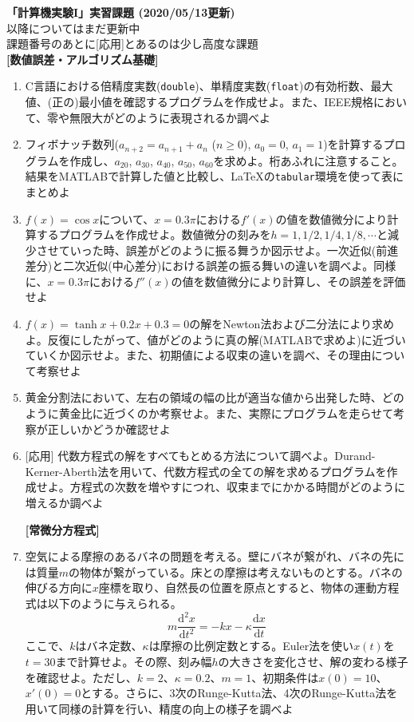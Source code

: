 \documentclass[11pt]{jarticle}
\begin{document}
\noindent
{\bf\large 「計算機実験I」実習課題 (2020/05/13更新)}
\\[-0.5em]

\noindent
[連立一次方程式]以降についてはまだ更新中\\[-0.5em]

\noindent
課題番号のあとに[応用]とあるのは少し高度な課題\\[-0.5em]

{\bf [数値誤差・アルゴリズム基礎]}
\begin{enumerate}
\item C言語における倍精度実数({\tt double})、単精度実数({\tt float})の有効桁数、最大値、(正の)最小値を確認するプログラムを作成せよ。また、IEEE規格において、零や無限大がどのように表現されるか調べよ
  
\item フィボナッチ数列($a_{n+2}=a_{n+1}+a_n$ ($n \ge 0$), $a_0=0$, $a_1=1$)を計算するプログラムを作成し、$a_{20}$, $a_{30}$, $a_{40}$, $a_{50}$, $a_{60}$を求めよ。桁あふれに注意すること。結果をMATLABで計算した値と比較し、\LaTeX の{\tt tabular}環境を使って表にまとめよ
  
\item $f(x)=\cos x$について、$x=0.3\pi$における$f'(x)$の値を数値微分により計算するプログラムを作成せよ。数値微分の刻みを$h=1,1/2,1/4,1/8,\cdots$と減少させていった時、誤差がどのように振る舞うか図示せよ。一次近似(前進差分)と二次近似(中心差分)における誤差の振る舞いの違いを調べよ。同様に、$x=0.3\pi$における$f''(x)$の値を数値微分により計算し、その誤差を評価せよ
  
\item $f(x)=\tanh x + 0.2 x + 0.3 = 0$の解をNewton法および二分法により求めよ。反復にしたがって、値がどのように真の解(MATLABで求めよ)に近づいていくか図示せよ。また、初期値による収束の違いを調べ、その理由について考察せよ
  
\item 黄金分割法において、左右の領域の幅の比が適当な値から出発した時、どのように黄金比に近づくのか考察せよ。また、実際にプログラムを走らせて考察が正しいかどうか確認せよ

\item \mbox{} [応用] 代数方程式の解をすべてもとめる方法について調べよ。Durand-Kerner-Aberth法を用いて、代数方程式の全ての解を求めるプログラムを作成せよ。方程式の次数を増やすにつれ、収束までにかかる時間がどのように増えるか調べよ

  \hspace*{-2em} {\bf [常微分方程式]}

\item 空気による摩擦のあるバネの問題を考える。壁にバネが繋がれ、バネの先には質量$m$の物体が繋がっている。床との摩擦は考えないものとする。バネの伸びる方向に$x$座標を取り、自然長の位置を原点とすると、物体の運動方程式は以下のように与えられる。
  \[
  m\frac{\mathrm{d} ^2x}{\mathrm{d} t^2} = -kx - \kappa \frac{\mathrm{d} x}{\mathrm{d} t} 
  \]
  ここで、$k$はバネ定数、$\kappa$は摩擦の比例定数とする。Euler法を使い$x(t)$を$t=30$まで計算せよ。その際、刻み幅$h$の大きさを変化させ、解の変わる様子を確認せよ。ただし、$k=2$、$\kappa = 0.2$、$m = 1$、初期条件は$x(0) = 10$、$x'(0) = 0$とする。さらに、3次のRunge-Kutta法、4次のRunge-Kutta法を用いて同様の計算を行い、精度の向上の様子を調べよ


\end{enumerate}
\end{document}
